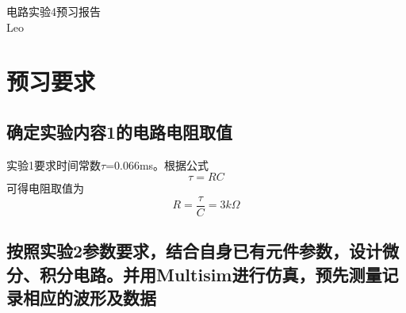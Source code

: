 \documentclass{ctexart}
\begin{document}
\begin{center}
    \Large{电路实验4预习报告}\\
    Leo
    
\end{center}
\section{预习要求}
\subsection{确定实验内容1的电路电阻取值}
实验1要求时间常数$\tau$=0.066ms。根据公式
\begin{equation}
    \tau=RC
\end{equation}
可得电阻取值为
\begin{equation}
    R=\dfrac{\tau}{C}=3k\Omega
\end{equation}
\subsection{按照实验2参数要求，结合自身已有元件参数，设计微分、积分电路。并用Multisim进行仿真，预先测量记录相应的波形及数据}
\end{document}
